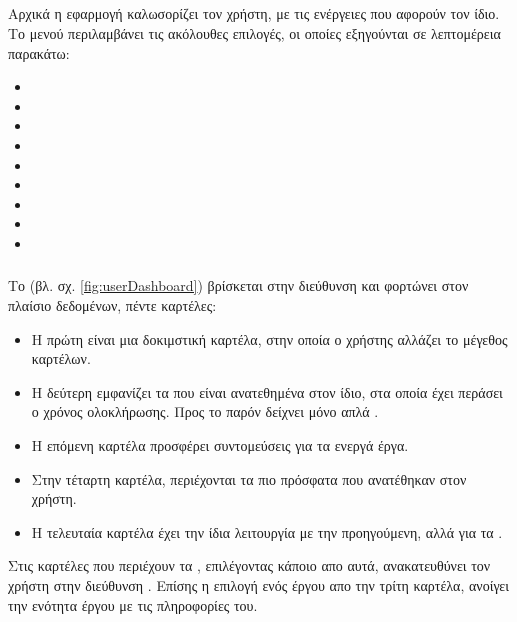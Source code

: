 \subsection{}
\pSpace Αρχικά η εφαρμογή καλωσορίζει τον χρήστη, με τις ενέργειες που αφορούν τον ίδιο. Το μενού περιλαμβάνει τις ακόλουθες επιλογές, οι οποίες εξηγούνται σε λεπτομέρεια παρακάτω:\\
\begin{itemize}
	\item {}
	\item {}
	\item {}
	\item {}
	\item {}
	\item {}
	\item {}
	\item {}
	\item {}
\end{itemize} 

\subsubsection*{}
\pSpace Το  (βλ. σχ. \ref{fig:userDashboard}) βρίσκεται στην διεύθυνση  και φορτώνει στον πλαίσιο δεδομένων, πέντε καρτέλες:
\begin{itemize}
	\item Η πρώτη είναι μια δοκιμστική καρτέλα, στην οποία ο χρήστης αλλάζει το μέγεθος καρτέλων.
	\item Η δεύτερη εμφανίζει τα  που είναι ανατεθημένα στον ίδιο, στα οποία έχει περάσει ο χρόνος ολοκλήρωσης. Προς το παρόν δείχνει μόνο απλά .
	\item Η επόμενη καρτέλα προσφέρει συντομεύσεις για τα ενεργά έργα.
	\item Στην τέταρτη καρτέλα, περιέχονται τα πιο πρόσφατα  που ανατέθηκαν στον χρήστη.
	\item Η τελευταία καρτέλα έχει την ίδια λειτουργία με την προηγούμενη, αλλά για τα .
\end{itemize}

\pSpace Στις καρτέλες που περιέχουν τα , επιλέγοντας κάποιο απο αυτά, ανακατευθύνει τον χρήστη στην διεύθυνση . Επίσης η επιλογή ενός έργου απο την τρίτη καρτέλα, ανοίγει την ενότητα έργου με τις πληροφορίες του.

